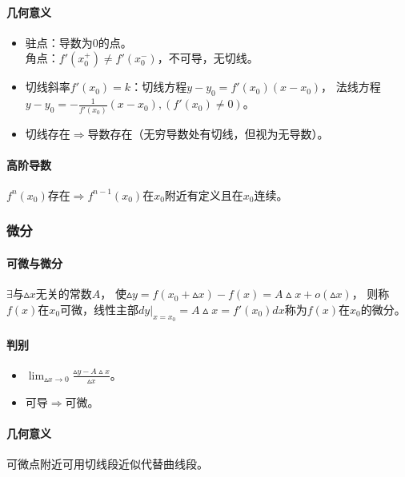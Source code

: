 \documentclass[
12pt, %
a4paper, 
oneside, %
headinclude,footinclude, %
]{scrartcl}
\begin{document}
\paragraph{几何意义}
\begin{itemize}
\item 驻点：导数为$ 0 $的点。\\
角点：$ f'(x_0^+) \neq f'(x_0^-) $，不可导，无切线。
\item 切线斜率$ f'(x_0) = k $：切线方程$ y - y_0 = f'(x_0)(x - x_0) $，
法线方程$ y - y_0 = -\frac{1}{f'(x_0)}(x - x_0),(f'(x_0) \neq 0) $。
\item 切线存在$ \Rightarrow $导数存在（无穷导数处有切线，但视为无导数）。
\end{itemize}
\paragraph{高阶导数}
$ f^{n}(x_0) $存在$ \Rightarrow $$ f^{n - 1}(x_0) $在$ x_0 $附近有定义且在$ x_0 $连续。
\subsubsection[微分]{微分}
\paragraph{可微与微分}
$ \exists$与$ \vartriangle x $无关的常数$ A $，
使$ \vartriangle y = f(x_0 + \vartriangle x) - f(x) = A \vartriangle x + o(\vartriangle x) $，
则称$ f(x) $在$ x_0 $可微，线性主部$ dy|_{x = x_0} = A \vartriangle x = f'(x_0)dx $称为$ f(x) $在$ x_0 $的微分。
\paragraph{判别}
\begin{itemize}
\item $ \lim_{\vartriangle x \to 0} \frac{\vartriangle y - A \vartriangle x}{\vartriangle x} $。
\item 可导$ \Rightarrow $可微。
\end{itemize}
\paragraph{几何意义}
可微点附近可用切线段近似代替曲线段。
\end{document}
